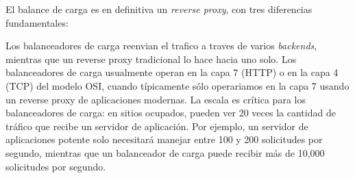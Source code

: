 El balance de carga es en definitiva un \textit{reverse proxy}, con tres diferencias fundamentales: 
\begin{outline}
\1 Los balanceadores de carga reenvian el trafico a traves de varios \textit{backends}, mientras que un reverse proxy tradicional lo hace hacia uno solo.
\1 Los balanceadores de carga usualmente operan en la capa 7 (HTTP) o en la capa 4 (TCP) del modelo OSI, cuando típicamente sólo operariamos en la capa 7 usando un reverse proxy de aplicaciones modernas.
\1 La escala es crítica para los balanceadores de carga: en sitios ocupados, pueden ver 20 veces la cantidad de tráfico que recibe un servidor de aplicación. Por ejemplo, un servidor de aplicaciones potente solo necesitará manejar entre 100 y 200 solicitudes por segundo, mientras que un balanceador de carga puede recibir más de 10,000 solicitudes por segundo.
\end{outline}